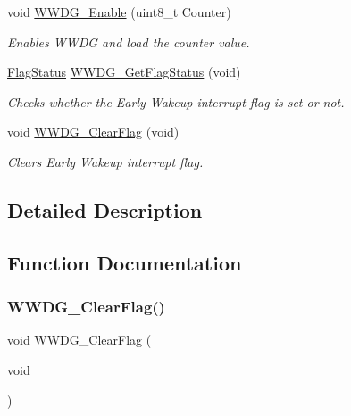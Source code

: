 \begin{DoxyCompactItemize}
void \mbox{\hyperlink{group___w_w_d_g___private___functions_ga10dc2554d0b504b5472e3ecf0f02a9e6}{W\+W\+D\+G\+\_\+\+Enable}} (uint8\+\_\+t Counter)
\begin{DoxyCompactList}\small\item\em Enables W\+W\+DG and load the counter value. \end{DoxyCompactList}\item 
\mbox{\hyperlink{group___exported__types_ga89136caac2e14c55151f527ac02daaff}{Flag\+Status}} \mbox{\hyperlink{group___w_w_d_g___private___functions_ga7df4882d45918b9b8249dfca1e44fabc}{W\+W\+D\+G\+\_\+\+Get\+Flag\+Status}} (void)
\begin{DoxyCompactList}\small\item\em Checks whether the Early Wakeup interrupt flag is set or not. \end{DoxyCompactList}\item 
void \mbox{\hyperlink{group___w_w_d_g___private___functions_gabd2b5a6317c2e1a3ab0795838ce59dd2}{W\+W\+D\+G\+\_\+\+Clear\+Flag}} (void)
\begin{DoxyCompactList}\small\item\em Clears Early Wakeup interrupt flag. \end{DoxyCompactList}\end{DoxyCompactItemize}


\subsection{Detailed Description}


\subsection{Function Documentation}
\mbox{\label{group___w_w_d_g___private___functions_gabd2b5a6317c2e1a3ab0795838ce59dd2}} 
\subsubsection{\texorpdfstring{WWDG\_ClearFlag()}{WWDG\_ClearFlag()}}
{\footnotesize\ttfamily void W\+W\+D\+G\+\_\+\+Clear\+Flag (\begin{DoxyParamCaption}\item[{void}]{ }\end{DoxyParamCaption})}



